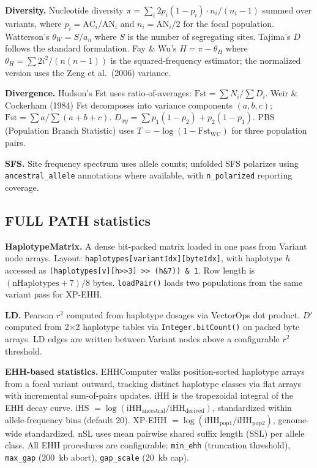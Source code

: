 \textbf{Diversity.} Nucleotide diversity $\pi = \sum_{i} 2p_i(1-p_i) \cdot n_i/(n_i-1)$ summed over variants, where $p_i = \text{AC}_i/\text{AN}_i$ and $n_i = \text{AN}_i/2$ for the focal population. Watterson's $\theta_W = S / a_n$ where $S$ is the number of segregating sites. Tajima's $D$ follows the standard formulation\cite{tajima1989statistical}. Fay \& Wu's $H = \pi - \theta_H$ where $\theta_H = \sum 2i^2/(n(n-1))$ is the squared-frequency estimator; the normalized version uses the Zeng et al.\ (2006) variance\cite{zeng2006statistical}.

\textbf{Divergence.} Hudson's Fst uses ratio-of-averages: $\text{Fst} = \sum N_i / \sum D_i$. Weir \& Cockerham (1984) Fst\cite{weir1984estimating} decomposes into variance components $(a, b, c)$; $\text{Fst} = \sum a / \sum(a+b+c)$. $D_{xy} = \sum p_1(1-p_2) + p_2(1-p_1)$. PBS (Population Branch Statistic)\cite{yi2010sequencing} uses $T = -\log(1 - \text{Fst}_\text{WC})$ for three population pairs.

\textbf{SFS.} Site frequency spectrum uses allele counts; unfolded SFS polarizes using \texttt{ancestral\_allele} annotations where available, with \texttt{n\_polarized} reporting coverage.

\subsection*{FULL PATH statistics}

\textbf{HaplotypeMatrix.} A dense bit-packed matrix loaded in one pass from Variant node arrays. Layout: \texttt{haplotypes[variantIdx][byteIdx]}, with haplotype $h$ accessed as \texttt{(haplotypes[v][h>>3] >> (h\&7)) \& 1}. Row length is $(\text{nHaplotypes}+7)/8$ bytes. \texttt{loadPair()} loads two populations from the same variant pass for XP-EHH.

\textbf{LD.} Pearson $r^2$ computed from haplotype dosages via VectorOps dot product. $D'$ computed from 2$\times$2 haplotype tables via \texttt{Integer.bitCount()} on packed byte arrays. LD edges are written between Variant nodes above a configurable $r^2$ threshold.

\textbf{EHH-based statistics.} EHHComputer walks position-sorted haplotype arrays from a focal variant outward, tracking distinct haplotype classes via flat arrays with incremental sum-of-pairs updates. iHH is the trapezoidal integral of the EHH decay curve. iHS\cite{voight2006map} $= \log(\text{iHH}_\text{ancestral}/\text{iHH}_\text{derived})$, standardized within allele-frequency bins (default 20). XP-EHH\cite{sabeti2007genome} $= \log(\text{iHH}_\text{pop1}/\text{iHH}_\text{pop2})$, genome-wide standardized. nSL\cite{ferrer2014defining} uses mean pairwise shared suffix length (SSL) per allele class. All EHH procedures are configurable: \texttt{min\_ehh} (truncation threshold), \texttt{max\_gap} (200~kb abort), \texttt{gap\_scale} (20~kb cap).

